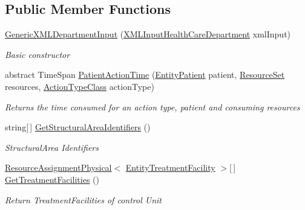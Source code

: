 \subsection*{Public Member Functions}
\begin{DoxyCompactItemize}
\item 
\hyperlink{class_general_health_care_elements_1_1_input_1_1_generic_x_m_l_department_input_a8b939b52f72ef6d98a3f430c4b853705}{Generic\+X\+M\+L\+Department\+Input} (\hyperlink{class_general_health_care_elements_1_1_input_1_1_x_m_l_input_health_care_department}{X\+M\+L\+Input\+Health\+Care\+Department} xml\+Input)
\begin{DoxyCompactList}\small\item\em Basic constructor \end{DoxyCompactList}\item 
abstract Time\+Span \hyperlink{class_general_health_care_elements_1_1_input_1_1_generic_x_m_l_department_input_a8f34c8852d97e6559f11e3acd2289a0f}{Patient\+Action\+Time} (\hyperlink{class_general_health_care_elements_1_1_entities_1_1_entity_patient}{Entity\+Patient} patient, \hyperlink{class_general_health_care_elements_1_1_resource_handling_1_1_resource_set}{Resource\+Set} resources, \hyperlink{class_general_health_care_elements_1_1_general_classes_1_1_action_types_and_paths_1_1_action_type_class}{Action\+Type\+Class} action\+Type)
\begin{DoxyCompactList}\small\item\em Returns the time consumed for an action type, patient and consuming resources \end{DoxyCompactList}\item 
string\mbox{[}$\,$\mbox{]} \hyperlink{class_general_health_care_elements_1_1_input_1_1_generic_x_m_l_department_input_a3ad613c23ecd1083c5ccc428b0c5bc3d}{Get\+Structural\+Area\+Identifiers} ()
\begin{DoxyCompactList}\small\item\em Structural\+Area Identifiers \end{DoxyCompactList}\item 
\hyperlink{class_general_health_care_elements_1_1_resource_handling_1_1_resource_assignment_physical}{Resource\+Assignment\+Physical}$<$ \hyperlink{class_general_health_care_elements_1_1_entities_1_1_entity_treatment_facility}{Entity\+Treatment\+Facility} $>$\mbox{[}$\,$\mbox{]} \hyperlink{class_general_health_care_elements_1_1_input_1_1_generic_x_m_l_department_input_a8169545156de22cc32e878959e448a7b}{Get\+Treatment\+Facilities} ()
\begin{DoxyCompactList}\small\item\em Return Treatment\+Facilities of control Unit \end{DoxyCompactList}\item 

\end{DoxyCompactItemize}
